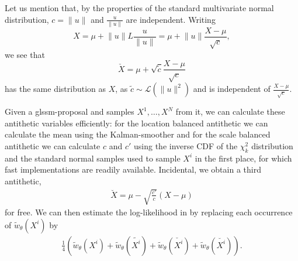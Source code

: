 Let us mention that, by the properties of the standard multivariate normal distribution, $ c = \lVert u \rVert $ and $ \frac{u}{ \lVert u \rVert }$ are independent. Writing 
$$
    X = \mu + \lVert u \rVert L \frac{u}{ \lVert u \rVert } = \mu + \lVert u \rVert \frac{X - \mu}{\sqrt{c}},
$$
we see that 
$$
    \check X = \mu + \sqrt{\tilde c}\frac{X - \mu}{\sqrt{c}}
$$
has the same distribution as $X$, as $\tilde c \sim \mathcal L( \lVert u \rVert^{2})$ and is independent of $ \frac{X - \mu}{\sqrt{c}}$. 

Given a \acrshort{glssm}-proposal and samples $X^{1}, \dots, X^{N}$ from it, we can calculate these antithetic variables efficiently: for the location balanced antithetic we can calculate the mean using the Kalman-smoother and for the scale balanced antithetic we can calculate $c$ and $c'$ using the inverse CDF of the $\chi^{2}_{k}$ distribution and the standard normal samples used to sample $X^{i}$ in the first place, for which fast implementations are readily available. Incidental, we obtain a third antithetic, 
\begin{align}
    \label{eq:antithetic-scale-location}
    \breve{X} = \mu - \sqrt{ \frac{c'}{c}} (X - \mu)
\end{align}
for free. We can then estimate the log-likelihood in  by replacing each occurrence of $\tilde w_{\theta}(X^{i})$ by 
\begin{align}
    \label{eq:antithetic-weights}
    \frac{1}{4} \left( \tilde w_{\theta} (X^{i}) + \tilde w_{\theta}(\tilde{X^{i}}) + \tilde w_{\theta}(\check{X^{i}}) + \tilde w_{\theta}(\breve{{X^{i}}}) \right).
\end{align}



